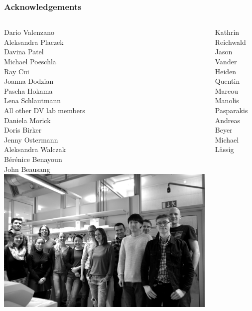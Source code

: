\documentclass[presentation]{beamer}
\begin{document}
%
\begin{frame}
\frametitle{Acknowledgements}
\small
\begin{columns}
Dario Valenzano\\
\alert{Aleksandra Placzek}\\
\alert{Davina Patel}\\
\alert{Michael Poeschla}\\
Ray Cui\\
Joanna Dodzian\\
\alert{Pascha Hokama}\\
\alert{Lena Schlautmann}\\\vspace{1.7ex}
All other DV lab members\\\vspace{1.7ex}
Daniela Morick\\
Doris Birker\\
Jenny Ostermann\\\vspace{1.7ex}
Aleksandra Walczak\\
B\'{e}r\'{e}nice Benayoun\\
John Beausang
\includegraphics[width=\textwidth]{figs/jpg/group-2016}\vspace{1em}\\
\begin{columns}
Kathrin Reichwald\\
Jason Vander Heiden\\
Quentin Marcou
Manolis Pasparakis\\
Andreas Beyer\\
Michael L\"assig\\
\end{columns}
\end{columns}
\end{frame}
%
\end{document}
